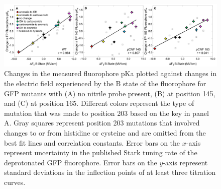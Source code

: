 \begin{figure}
    \center
    \includegraphics[width=\double]{figures-gfp-pKa/pKa_vs_elec_stark.png}
    \caption{
        Changes in the measured fluorophore pKa plotted against changes in the electric field experienced by the B state of the fluorophore for GFP mutants with (A) no nitrile probe present, (B) \pCNF{} at position 145, and (C) \pCNF{} at position 165. 
        Different colors represent the type of mutation that was made to position 203 based on the key in panel A. 
        Gray squares represent position 203 mutations that involved changes to or from histidine or cysteine and are omitted from the best fit lines and correlation constants. 
        Error bars on the $x$-axis represent uncertainty in the published Stark tuning rate of the deprotonated GFP fluorophore. 
        Error bars on the $y$-axis represent standard deviations in the inflection points of at least three \pKa{} titration curves.
    }
    \label{fig:pKa_vs_stark}
\end{figure}

